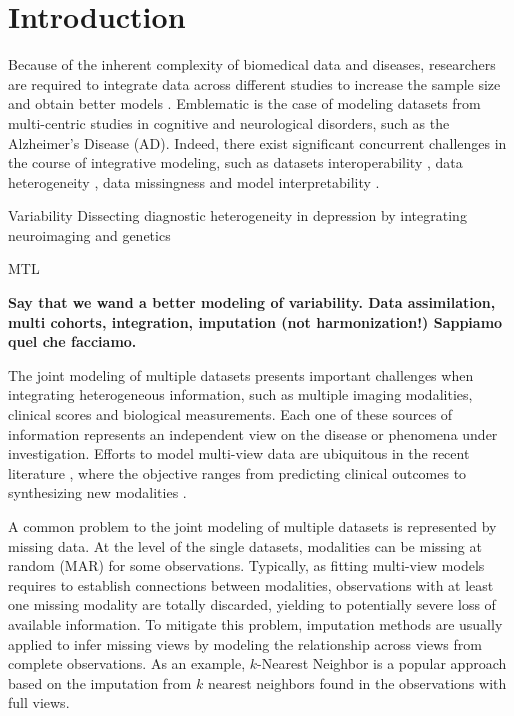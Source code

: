 \section{Introduction}

Because of the inherent complexity of biomedical data and diseases,
researchers are required to integrate data across different studies to increase the sample size and obtain better models \citep{LeSueur2020}.
Emblematic is the case of modeling datasets from multi-centric studies in cognitive and neurological disorders, such as the Alzheimer's Disease (AD).
Indeed, there exist significant concurrent challenges in the course of integrative modeling, such as
datasets interoperability \citep{Tognin2020},
data heterogeneity \citep{Buch2020},
data missingness and model interpretability \citep{GolrizKhatami2020}.

Variability
\citep{Buch2020}
Dissecting diagnostic heterogeneity in depression by integrating neuroimaging and genetics

MTL 


\textbf{
	Say that we wand a better modeling of variability.
Data assimilation, multi cohorts, integration, imputation (not harmonization!)
Sappiamo quel che facciamo.
}

The joint modeling of multiple datasets presents important challenges when integrating heterogeneous information,
such as multiple imaging modalities, clinical scores and biological measurements.
Each one of these sources of information represents an independent view on the disease or phenomena under investigation.
Efforts to model multi-view data are ubiquitous in the recent literature \citep{Vieira2020}, where the objective ranges from predicting clinical outcomes \citep{Chen2019} to synthesizing new modalities \citep{Zhou2020, Wei2019}.

A common problem to the joint modeling of multiple datasets is represented by missing data.
At the level of the single datasets, modalities can be missing at random (MAR) for some observations.
Typically, as fitting multi-view models requires to establish connections between modalities, observations with at least one missing modality are totally discarded, yielding to potentially severe loss of available information.
To mitigate this problem, imputation methods are usually applied to infer missing views by modeling the relationship across views from complete observations.
As an example, $k$-Nearest Neighbor is a popular approach based on the imputation from $k$ nearest neighbors found in the observations with full views.

